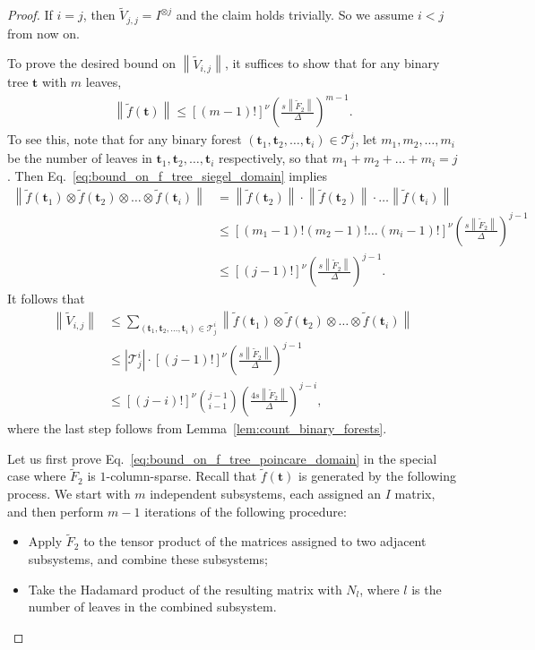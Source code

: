 \documentclass[superscriptaddress,onecolumn,nofootinbib,longbibliography,a4paper,accepted=2026-09-29]{quantumarticle}
\theoremstyle{plain}
\theoremstyle{definition}
\numberwithin{thm}{section}
\numberwithin{assumption}{section}
\numberwithin{lemma}{section}
\numberwithin{prop}{section}
\numberwithin{cor}{section}
\numberwithin{definition}{section}
\numberwithin{rmk}{section}
\numberwithin{equation}{section}
\newcommand{\norm}[1]     {\left\| #1 \right\|}
\newcommand{\lrb}[1]{\left ( #1 \right )}
\newcommand{\lrsb}[1]{\left [ #1 \right ]}
\newcommand{\mbt}{\mathbf{t}}
\begin{document}
\begin{proof}
If $i=j$, then $\tilde{V}_{j,j}=I^{\otimes j}$ and the claim  holds trivially. So we assume $i<j$ from now on.

To prove the desired bound on $\norm{\tilde{V}_{i,j}}$, it suffices to show that for any binary tree $\mbt$ with $m$ leaves, 
\begin{align}
 \norm{\tilde{f}(\mbt)} \le [(m-1)!]^{\nu} \lrb{\frac{s\norm{\tilde{F}_2}}{\Delta}}^{m-1}.   
 \label{eq:bound_on_f_tree_siegel_domain}
\end{align}
To see this, note that for any binary forest $(\mbt_1, \mbt_2, \dots, \mbt_i) \in \mathcal{T}^i_j$, let $m_1,m_2,\dots,m_i$ be the number of leaves in $\mbt_1, \mbt_2,\dots, \mbt_i$ respectively, so that $m_1+m_2+\dots+m_i=j$. Then
Eq.~\eqref{eq:bound_on_f_tree_siegel_domain} implies 
\begin{align}
\norm{\tilde{f}(\mbt_1)\otimes \tilde{f}(\mbt_2)\otimes \dots \otimes \tilde{f}(\mbt_i)}
&= \norm{\tilde{f}(\mbt_2)}\cdot
        \norm{\tilde{f}(\mbt_2)} \cdot
        \dots
            \norm{\tilde{f}(\mbt_i)}  \\
&\le 
[(m_1-1)!(m_2-1)!\dots (m_i-1)!]^{\nu} \lrb{\frac{s\norm{\tilde{F}_2}}{\Delta}}^{j-1} \\
&\le 
[(j-1)!]^\nu
\lrb{\frac{s\norm{\tilde{F}_2}}{\Delta}}^{j-1}.
\end{align}
It follows that
\begin{align}
\norm{\tilde{V}_{i,j}} &\le \sum_{(\mbt_1, \mbt_2, \dots, \mbt_i) \in \mathcal{T}^i_j}
    \norm{\tilde{f}(\mbt_1)\otimes \tilde{f}(\mbt_2)\otimes \dots \otimes \tilde{f}(\mbt_i)} \\ 
    &\le |\mathcal{T}^i_j| \cdot [(j-1)!]^\nu \lrb{\frac{s\norm{\tilde{F}_2}}{\Delta}}^{j-1} \\
    & \le \lrsb{(j-i)!}^\nu\binom{j-1}{i-1} \lrb{\frac{4s\norm{\tilde{F}_2}}{\Delta}}^{j-i},
\end{align}
where the last step follows from Lemma~\ref{lem:count_binary_forests}.

Let us first prove Eq.~\eqref{eq:bound_on_f_tree_poincare_domain} in the special case where $\tilde{F}_2$ is $1$-column-sparse. Recall that \( \tilde{f}(\mbt) \) is generated by the following process. We start with \( m \) independent subsystems, each assigned an \( I \) matrix, and then perform \( m-1 \) iterations of the following procedure: 
\begin{itemize} 
\item Apply \( \tilde{F}_2 \) to the tensor product of the matrices assigned to two adjacent subsystems, and combine these subsystems; 
\item Take the Hadamard product of the resulting matrix with \( N_l \), where \( l \) is the number of leaves in the combined subsystem. 
\end{itemize} 


\end{proof}
\end{document}
